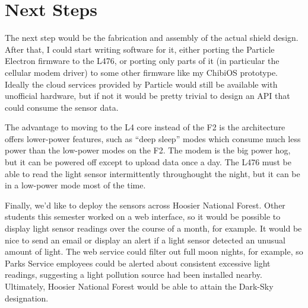 \documentclass{article}
\begin{document}
\section*{Next Steps}
The next step would be the fabrication and assembly of the actual shield design. After that, I could start writing software for it, either porting the Particle Electron firmware to the L476, or porting only parts of it (in particular the cellular modem driver) to some other firmware like my ChibiOS prototype. Ideally the cloud services provided by Particle would still be available with unofficial hardware, but if not it would be pretty trivial to design an API that could consume the sensor data.

The advantage to moving to the L4 core instead of the F2 is the architecture offers lower-power features, such as ``deep sleep'' modes which consume much less power than the low-power modes on the F2. The modem is the big power hog, but it can be powered off except to upload data once a day. The L476 must be able to read the light sensor intermittently throughought the night, but it can be in a low-power mode most of the time.

Finally, we'd like to deploy the sensors across Hoosier National Forest. Other students this semester worked on a web interface, so it would be possible to display light sensor readings over the course of a month, for example. It would be nice to send an email or display an alert if a light sensor detected an unusual amount of light. The web service could filter out full moon nights, for example, so Parks Service employees could be alerted about consistent excessive light readings, suggesting a light pollution source had been installed nearby. Ultimately, Hoosier National Forest would be able to attain the Dark-Sky designation.
\end{document}
